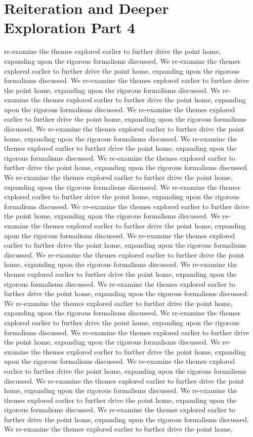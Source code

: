 \section{Reiteration and Deeper Exploration Part 4}\nWe re-examine the themes explored earlier to further drive the point home, expanding upon the rigorous formalisms discussed. We re-examine the themes explored earlier to further drive the point home, expanding upon the rigorous formalisms discussed. We re-examine the themes explored earlier to further drive the point home, expanding upon the rigorous formalisms discussed. We re-examine the themes explored earlier to further drive the point home, expanding upon the rigorous formalisms discussed. We re-examine the themes explored earlier to further drive the point home, expanding upon the rigorous formalisms discussed. We re-examine the themes explored earlier to further drive the point home, expanding upon the rigorous formalisms discussed. We re-examine the themes explored earlier to further drive the point home, expanding upon the rigorous formalisms discussed. We re-examine the themes explored earlier to further drive the point home, expanding upon the rigorous formalisms discussed. We re-examine the themes explored earlier to further drive the point home, expanding upon the rigorous formalisms discussed. We re-examine the themes explored earlier to further drive the point home, expanding upon the rigorous formalisms discussed. We re-examine the themes explored earlier to further drive the point home, expanding upon the rigorous formalisms discussed. We re-examine the themes explored earlier to further drive the point home, expanding upon the rigorous formalisms discussed. We re-examine the themes explored earlier to further drive the point home, expanding upon the rigorous formalisms discussed. We re-examine the themes explored earlier to further drive the point home, expanding upon the rigorous formalisms discussed. We re-examine the themes explored earlier to further drive the point home, expanding upon the rigorous formalisms discussed. We re-examine the themes explored earlier to further drive the point home, expanding upon the rigorous formalisms discussed. We re-examine the themes explored earlier to further drive the point home, expanding upon the rigorous formalisms discussed. We re-examine the themes explored earlier to further drive the point home, expanding upon the rigorous formalisms discussed. We re-examine the themes explored earlier to further drive the point home, expanding upon the rigorous formalisms discussed. We re-examine the themes explored earlier to further drive the point home, expanding upon the rigorous formalisms discussed. We re-examine the themes explored earlier to further drive the point home, expanding upon the rigorous formalisms discussed. We re-examine the themes explored earlier to further drive the point home, expanding upon the rigorous formalisms discussed. We re-examine the themes explored earlier to further drive the point home, expanding upon the rigorous formalisms discussed. We re-examine the themes explored earlier to further drive the point home, expanding upon the rigorous formalisms discussed. We re-examine the themes explored earlier to further drive the point home, 